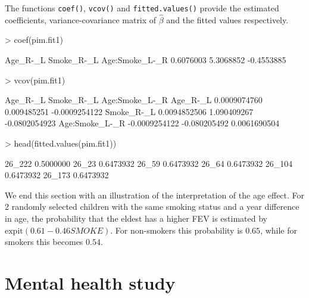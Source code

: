 \documentclass[12pt]{article}
\begin{document}
The functions \texttt{coef()}, \texttt{vcov()} and \texttt{fitted.values()} provide the estimated coefficients, variance-covariance matrix of $\hat{\beta}$ and the fitted values respectively. 
\begin{Schunk}
\begin{Sinput}
> coef(pim.fit1)
\end{Sinput}
\begin{Soutput}
      Age_R-_L     Smoke_R-_L Age:Smoke_L-_R 
     0.6076003      5.3068852     -0.4553885 
\end{Soutput}
\begin{Sinput}
> vcov(pim.fit1)
\end{Sinput}
\begin{Soutput}
                    Age_R-_L   Smoke_R-_L Age:Smoke_L-_R
Age_R-_L        0.0009074760  0.009485251  -0.0009254122
Smoke_R-_L      0.0094852506  1.090409267  -0.0802054923
Age:Smoke_L-_R -0.0009254122 -0.080205492   0.0061690504
\end{Soutput}
\begin{Sinput}
> head(fitted.values(pim.fit1))
\end{Sinput}
\begin{Soutput}
            [,1]
26_222 0.5000000
26_23  0.6473932
26_59  0.6473932
26_64  0.6473932
26_104 0.6473932
26_173 0.6473932
\end{Soutput}
\end{Schunk}

We end this section with an illustration of the interpretation of the age effect. For 2 randomly selected children with the same smoking status and a year difference in age, the probability that the eldest has a higher FEV is estimated by $\text{expit}(0.61 - 0.46SMOKE)$. For non-smokers this probability is $0.65$, while for smokers this becomes $0.54$.

\section{Mental health study}
\end{document}
